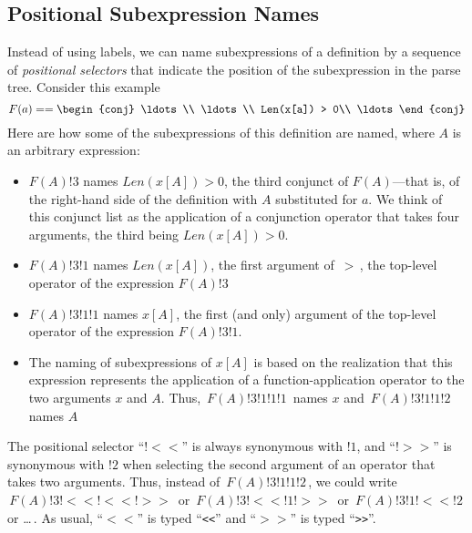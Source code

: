 \documentclass[fleqn,leqno]{article}
\begin{document}
\subsection*{Positional Subexpression Names}

Instead of using labels, we can name subexpressions of a definition by
a sequence of \emph{positional selectors} that indicate the position
of the subexpression in the parse tree.  Consider this example
 \[ F(a) == \begin{conj}
            \ldots \\
            \ldots \\
            Len(x[a]) > 0\\
            \ldots 
            \end{conj}
 \]
Here are how some of the subexpressions of this definition are
named, where $A$ is an arbitrary expression:%
\begin{itemize}
\item $F(A)!3$ names $Len(x[A]) > 0$, the third conjunct of
$F(A)$---that is, of the right-hand side of the definition with $A$
substituted for $a$.  We think of this conjunct list as the
application of a conjunction operator that takes four arguments, the
third being $Len(x[A]) > 0$.

\item $F(A)!3!1$ names $Len(x[A])$, the first argument of 
$\,>\,$, the top-level operator of the expression $F(A)!3$

\item $F(A)!3!1!1$ names $x[A]$, the first (and only) argument
of the top-level operator of the expression $F(A)!3!1$.

\item The naming of subexpressions of $x[A]$ is based on the
realization that this expression represents the application
of a function-application operator to the two arguments $x$ and $A$.
Thus, $\,F(A)!3!1!1!1\,$ names $x$ and
$\,F(A)!3!1!1!2\,$ names $A$
\end{itemize}
The positional selector ``$!<<$'' is always synonymous with $!1$, and
``$!>>$'' is synonymous with $!2$ when selecting the second argument
of an operator that takes two arguments.  Thus, instead of
$\,F(A)!3!1!1!2\,$, we could write $\,F(A)!3!<<!<<!>>\,$ or
$\,F(A)!3!<<!1!>>\,$ or $\,F(A)!3!1!<<!2\,$ or \ldots\,.  As usual,
``$<<$'' is typed ``\texttt{<<}'' and ``$>>$'' is typed
``\texttt{>>}''.
\end{document}

